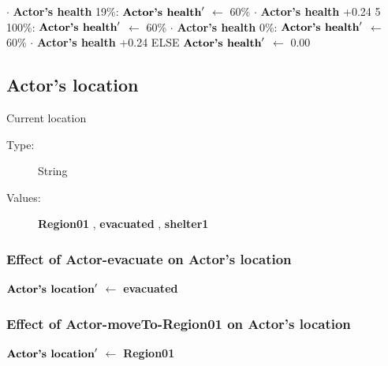 \documentclass{article}%
\begin{document}
\begin{flushleft}
$\cdot$%
\textbf{Actor's health}%
\linebreak%
\hspace*{6em}%
19\%: %
$\mbox{\textbf{Actor's health}} '$%
$\leftarrow$%
60\%%
$\cdot$%
\textbf{Actor's health}%
+0.24%
\linebreak%
\hspace*{4em}%
5 %
\linebreak%
\hspace*{6em}%
100\%: %
$\mbox{\textbf{Actor's health}} '$%
$\leftarrow$%
60\%%
$\cdot$%
\textbf{Actor's health}%
\linebreak%
\hspace*{6em}%
0\%: %
$\mbox{\textbf{Actor's health}} '$%
$\leftarrow$%
60\%%
$\cdot$%
\textbf{Actor's health}%
+0.24%
\linebreak%
\hspace*{2em}%
ELSE %
$\mbox{\textbf{Actor's health}} '$%
$\leftarrow$%
0.00%
\end{flushleft}

%
\subsection{Actor's location}%
\label{subsec:Actor's location}%
Current location%
\begin{description}%
\item[Type:]%
String%
\item[Values:]%
\textbf{Region01}%
, %
\textbf{evacuated}%
, %
\textbf{shelter1}%
\end{description}%
\subsubsection{Effect of Actor{-}evacuate on Actor's location}%
\label{ssubsec:Effect of Actor{-}evacuate on Actor's location}%
\begin{flushleft}%
$\mbox{\textbf{Actor's location}} '$%
$\leftarrow$%
\textbf{evacuated}%
\end{flushleft}

%
\subsubsection{Effect of Actor{-}moveTo{-}Region01 on Actor's location}%
\label{ssubsec:Effect of Actor{-}moveTo{-}Region01 on Actor's location}%
\begin{flushleft}%
$\mbox{\textbf{Actor's location}} '$%
$\leftarrow$%
\textbf{Region01}%
\end{flushleft}
\end{document}
